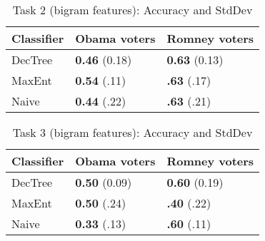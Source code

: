 \begin{table}[H]
\begin{centering}
\begin{tabular}{ l | l | l }
Classifier & Obama voters & Romney voters \\
\hline
DecTree & \textbf{0.46} (0.18) &  \textbf{0.63} (0.13) \\
MaxEnt & \textbf{0.54} (.11) &  \textbf{.63} (.17) \\
Naive & \textbf{0.44} (.22) &  \textbf{.63} (.21) \\
\end{tabular}
\caption{Task 2 (bigram features): Accuracy and StdDev}
\label{tab:task2bigrams}
\end{centering}
\end{table}

\begin{table}[H]
\begin{centering}
\begin{tabular}{ l | l | l }
Classifier & Obama voters & Romney voters \\
\hline
DecTree & \textbf{0.50} (0.09) &  \textbf{0.60} (0.19) \\
MaxEnt & \textbf{0.50} (.24) &  \textbf{.40} (.22) \\
Naive & \textbf{0.33} (.13) &  \textbf{.60} (.11) \\
\end{tabular}
\caption{Task 3 (bigram features): Accuracy and StdDev}
\label{tab:task3bigrams}
\end{centering}
\end{table}